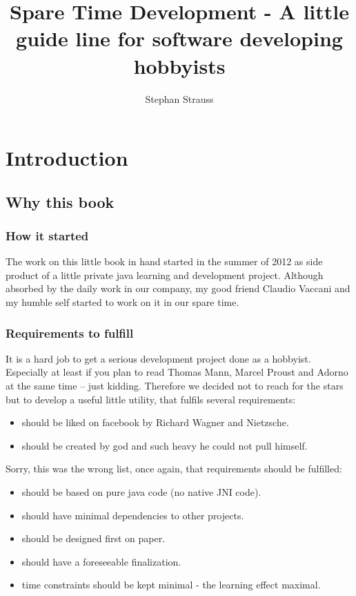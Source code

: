 \documentclass[a4paper]{book}
\author{Stephan Strauss}
\begin{document}
    \title{Spare Time Development - A little guide line for software developing hobbyists}
    \maketitle
    
\part{Introduction}

\chapter{Why this book}

\section{How it started}

The work on this little book in hand started in the summer of 2012 as side product of a little private java learning and development project. Although absorbed by the daily work in our company, my good friend Claudio Vaccani and my humble self started to work on it in our spare time. 

\section[Requirements]{Requirements to fulfill}

It is a hard job to get a serious development project done as a hobbyist. Especially at least if you plan to read Thomas Mann, Marcel Proust and Adorno at the same time -- just kidding. Therefore we decided not to reach for the stars but to develop a useful little utility, that fulfils several requirements:


\begin{itemize}
\item should be liked on facebook by Richard Wagner and Nietzsche.
\item should be created by god and such heavy he could not pull himself. 
\end{itemize}
Sorry, this was the wrong list, once again, that requirements should be fulfilled:

\begin{itemize}
\item should be based on pure java code (no native JNI code).
\item should have minimal dependencies to other projects. 
\item should be designed first on paper. 
\item should have a foreseeable finalization.
\item time constraints should be kept minimal - the learning effect maximal. 
\end{itemize}
\end{document}
